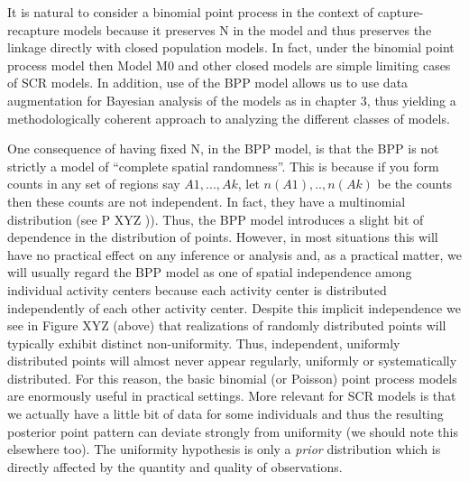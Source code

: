 It is natural to consider a binomial point process in the context of capture-recapture models because it preserves N in the model and thus preserves the linkage directly with closed population models. In fact, under the binomial point process model then Model M0 and other closed models are simple limiting cases of SCR models. In addition, use of the BPP model allows us to use data augmentation for Bayesian analysis of the models as in chapter 3, thus yielding a methodologically coherent approach to analyzing the different classes of models. 

One consequence of having fixed N, in the BPP model, is that the BPP is not strictly a model of ``complete spatial randomness''. This is because if you form counts in any set of regions say $A1, ..., Ak$,  let $n(A1), .., n(Ak)$ be the counts then these counts are not independent. In fact, they have a multinomial distribution (see \citet{illian_etal:2008} P XYZ )). Thus, the BPP model introduces a slight bit of dependence in the distribution of points. However, in most situations this will have no practical effect on any inference or analysis and, as a practical matter, we will usually regard the BPP model as one of spatial independence among individual activity centers because each activity center is distributed independently of each other activity center. Despite this implicit independence we see in Figure XYZ (above) that realizations of randomly distributed points will typically exhibit distinct non-uniformity. Thus, independent, uniformly distributed points will almost never appear regularly, uniformly or systematically distributed. For this reason, the basic binomial (or Poisson) point process models are enormously useful in practical settings. 
More relevant for SCR models is that we actually have a little bit of data for some individuals and thus the resulting posterior point pattern can deviate strongly from uniformity (we should note this elsewhere too). The uniformity hypothesis is only a {\it prior} distribution which is directly affected by the quantity and quality of observations.


